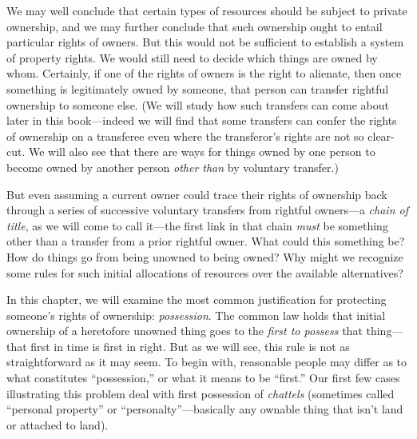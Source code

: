 We may well conclude that certain types of resources should be subject to
private ownership, and we may further conclude that such ownership ought to
entail particular rights of owners. But this would not be sufficient to
establish a system of property rights. We would still need to decide which
things are owned by whom. Certainly, if one of the rights of owners is the right
to alienate, then once something is legitimately owned by someone, that person
can transfer rightful ownership to someone else. (We will study how such
transfers can come about later in this book---indeed we will find that some
transfers can confer the rights of ownership on a transferee even where the
transferor's rights are not so clear-cut. We will also see that there are ways
for things owned by one person to become owned by another person \textit{other
than} by voluntary transfer.)

But even assuming a current owner could trace their rights of ownership back
through a series of successive voluntary transfers from rightful owners---a
\textit{chain of title}, as we will come to call it---the first link in that
chain \textit{must} be something other than a transfer from a prior rightful
owner. What could this something be? How do things go from being unowned to
being owned? Why might we recognize some rules for such initial allocations of
resources over the available alternatives? 

In this chapter, we will examine the most common justification for protecting
someone's rights of ownership: \textit{possession}. The common law holds that
initial ownership of a heretofore unowned thing goes to the \textit{first to
possess} that thing---that first in time is first in right. But as we will see,
this rule is not as straightforward as it may seem. To begin with, reasonable
people may differ as to what constitutes ``possession,'' or what it means to be
``first.'' Our first few cases illustrating this problem deal with first
possession of \textit{chattels} (sometimes called ``personal property'' or
``personalty''---basically any ownable thing that isn't land or attached to
land).

